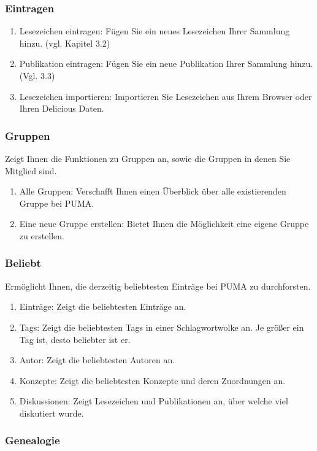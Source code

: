 \subsubsection{Eintragen}
\begin{enumerate}
    \item Lesezeichen eintragen: Fügen Sie ein neues Lesezeichen Ihrer Sammlung hinzu. (vgl. Kapitel 3.2) 
    \item Publikation eintragen: Fügen Sie ein neue Publikation Ihrer Sammlung hinzu. (Vgl. 3.3)
    \item Lesezeichen importieren: Importieren Sie Lesezeichen aus Ihrem Browser oder Ihren Delicious Daten.
\end{enumerate}


\subsubsection{Gruppen}
Zeigt Ihnen die Funktionen zu Gruppen an, sowie die Gruppen in denen Sie Mitglied sind.
\begin{enumerate}
    \item Alle Gruppen: Verschafft Ihnen einen Überblick über alle existierenden Gruppe bei PUMA.
    \item Eine neue Gruppe erstellen: Bietet Ihnen die Möglichkeit eine eigene Gruppe zu erstellen.
\end{enumerate}
\subsubsection{Beliebt}
Ermöglicht Ihnen, die derzeitig beliebtesten Einträge bei PUMA zu durchforsten.
\begin{enumerate}
    \item Einträge: Zeigt die beliebtesten Einträge an.
    \item Tags: Zeigt die beliebtesten Tags in einer Schlagwortwolke an. Je größer ein Tag ist, desto beliebter ist er.
    \item Autor: Zeigt die beliebtesten Autoren an.
    \item Konzepte: Zeigt die beliebtesten Konzepte und deren Zuordnungen an. 
    \item Diskussionen: Zeigt Lesezeichen und Publikationen an, über welche viel diskutiert wurde. 
\end{enumerate}
\subsubsection{Genealogie}

